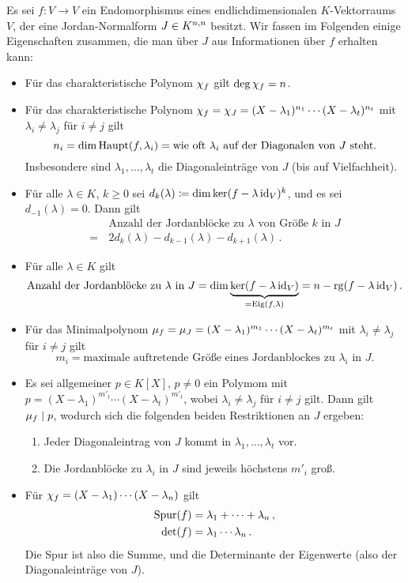 \documentclass[a4paper,10pt,numbers = noenddot]{scrartcl}
\begin{document}
Es sei $f \colon V \to V$ ein Endomorphismus eines endlichdimensionalen $K$-Vektorraums $V$, der eine Jordan-Normalform $J \in \matrices{n}{K}$ besitzt.
Wir fassen im Folgenden einige Eigenschaften zusammen, die man über $J$ aus Informationen über $f$ erhalten kann:
\begin{itemize}
  \item
    Für das charakteristische Polynom $\charpol{f}$ gilt $\deg \charpol{f} = n$.
  \item
    Für das charakteristische Polynom $\charpol{f} = \charpol{J} = (X - \lambda_1)^{n_1} \dotsm (X - \lambda_t)^{n_t}$ mit $\lambda_i \neq \lambda_j$ für $i \neq j$ gilt
    \[
        n_i
      = \dim \hauptspace{f}{\lambda_i}
      = \text{wie oft $\lambda_i$ auf der Diagonalen von $J$ steht}.
    \]
    Insbesondere sind $\lambda_1, \dotsc, \lambda_t$ die Diagonaleinträge von $J$ (bis auf Vielfachheit).
  \item
    Für alle $\lambda \in K$, $k \geq 0$ sei $d_k(\lambda) \defined \dim \ker(f - \lambda \id_V)^k$, und es sei $d_{-1}(\lambda) = 0$.
    Dann gilt
    \begin{align*}
       &\,  \text{Anzahl der Jordanblöcke zu $\lambda$ von Größe $k$ in $J$} \\
      =&\,  2 d_k(\lambda) - d_{k-1}(\lambda) - d_{k+1}(\lambda) \,.
    \end{align*}
  \item
    Für alle $\lambda \in K$ gilt
    \[
        \text{Anzahl der Jordanblöcke zu $\lambda$ in $J$}
      = \dim \underbrace{ \ker (f - \lambda \id_V) }_{= \eigenspace{f}{\lambda}}
      = n - \rank (f - \lambda \id_V) \,.
    \]
  \item
    Für das Minimalpolynom $\minpol{f} = \minpol{J} = (X - \lambda_1)^{m_1} \dotsm (X - \lambda_t)^{m_t}$ mit $\lambda_i \neq \lambda_j$ für $i \neq j$ gilt
    \[
        m_i
      = \text{maximale auftretende Größe eines Jordanblockes zu $\lambda_i$ in $J$}.
    \]
  \item
    Es sei allgemeiner $p \in K[X]$, $p \neq 0$ ein Polymom mit $p = (X - \lambda_1)^{m'_t} \dotsm (X - \lambda_t)^{m'_t}$, wobei $\lambda_i \neq \lambda_j$ für $i \neq j$ gilt.
    Dann gilt $\minpol{f} \divides p$, wodurch sich die folgenden beiden Restriktionen an $J$ ergeben:
    \begin{enumerate}
      \item
        Jeder Diagonaleintrag von $J$ kommt in $\lambda_1, \dotsc, \lambda_t$ vor.
      \item
        Die Jordanblöcke zu $\lambda_i$ in $J$ sind jeweils höchstens $m'_i$ groß.
    \end{enumerate}
  \item
    Für $\charpol{f} = (X - \lambda_1) \dotsm (X - \lambda_n)$ gilt
    \begin{align*}
      \tr(f)  &=  \lambda_1 + \dotsb + \lambda_n \,,  \\
      \det(f) &=  \lambda_1 \dotsm \lambda_n \,.
    \end{align*}
    Die Spur ist also die Summe, und die Determinante der Eigenwerte (also der Diagonaleinträge von $J$).
\end{itemize}
\end{document}
